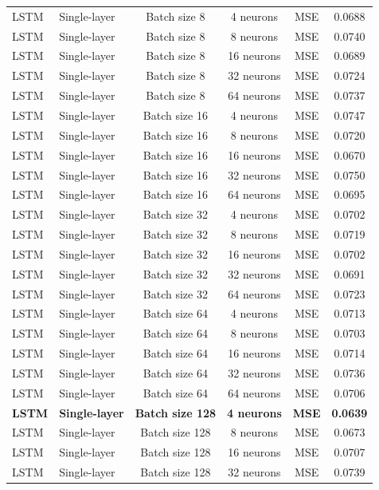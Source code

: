 \begin{landscape}
\begin{longtable}{llcccc}
LSTM & Single-layer & Batch size 8   & 4 neurons  & MSE  & 0.0688 \\
LSTM & Single-layer & Batch size 8   & 8 neurons  & MSE  & 0.0740 \\
LSTM & Single-layer & Batch size 8   & 16 neurons & MSE  & 0.0689 \\
LSTM & Single-layer & Batch size 8   & 32 neurons & MSE  & 0.0724 \\
LSTM & Single-layer & Batch size 8   & 64 neurons & MSE  & 0.0737 \\
LSTM & Single-layer & Batch size 16  & 4 neurons  & MSE  & 0.0747 \\
LSTM & Single-layer & Batch size 16  & 8 neurons  & MSE  & 0.0720 \\
LSTM & Single-layer & Batch size 16  & 16 neurons & MSE  & 0.0670 \\
LSTM & Single-layer & Batch size 16  & 32 neurons & MSE  & 0.0750 \\
LSTM & Single-layer & Batch size 16  & 64 neurons & MSE  & 0.0695 \\
LSTM & Single-layer & Batch size 32  & 4 neurons  & MSE  & 0.0702 \\
LSTM & Single-layer & Batch size 32  & 8 neurons  & MSE  & 0.0719 \\
LSTM & Single-layer & Batch size 32  & 16 neurons & MSE  & 0.0702 \\
LSTM & Single-layer & Batch size 32  & 32 neurons & MSE  & 0.0691 \\
LSTM & Single-layer & Batch size 32  & 64 neurons & MSE  & 0.0723 \\
LSTM & Single-layer & Batch size 64  & 4 neurons  & MSE  & 0.0713 \\
LSTM & Single-layer & Batch size 64  & 8 neurons  & MSE  & 0.0703 \\
LSTM & Single-layer & Batch size 64  & 16 neurons & MSE  & 0.0714 \\
LSTM & Single-layer & Batch size 64  & 32 neurons & MSE  & 0.0736 \\
LSTM & Single-layer & Batch size 64  & 64 neurons & MSE  & 0.0706 \\
\textbf{LSTM} & \textbf{Single-layer} & \textbf{Batch size 128} & \textbf{4 neurons}  & \textbf{MSE}  & \textbf{0.0639} \\
LSTM & Single-layer & Batch size 128 & 8 neurons  & MSE  & 0.0673 \\
LSTM & Single-layer & Batch size 128 & 16 neurons & MSE  & 0.0707 \\
LSTM & Single-layer & Batch size 128 & 32 neurons & MSE  & 0.0739 \\

\end{longtable}
\end{landscape}
